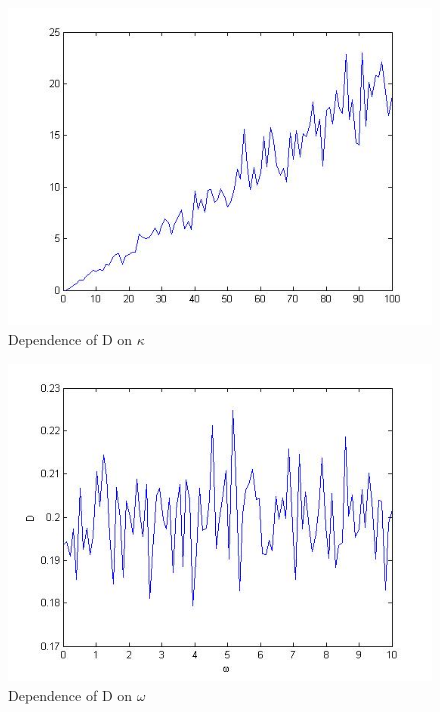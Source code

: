 \documentclass[11pt]{article} %
\begin{document}
\begin{figure}
	\centering
		\includegraphics[scale = 0.5]{q1a_kappa.jpg}
		\caption{Dependence of D on $\kappa$}
\end{figure}
\begin{figure}
	\centering
		\includegraphics[scale = 0.5]{q1a_omega}
		\caption{Dependence of D on $\omega$}
\end{figure}
\end{document}
